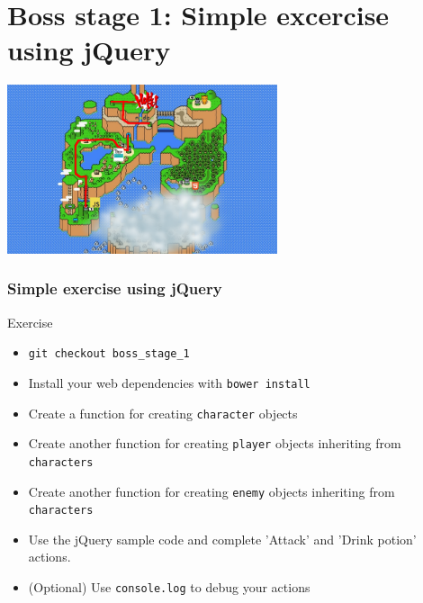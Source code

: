 \section{Boss stage 1: Simple excercise using jQuery}

\begin{frame}[fragile]
  \begin{center}
    \includegraphics[width=300px]{images/map_boss_stage_1.png}
  \end{center}
\end{frame}

\begin{frame}[fragile]
  \frametitle{Simple exercise using jQuery}
  \begin{block}{Exercise}
    \begin{itemize}
      \item \texttt{git checkout boss\_stage\_1}
      \item Install your web dependencies with \texttt{bower install}
      \item Create a function for creating \texttt{character} objects
      \item Create another function for creating \texttt{player} objects inheriting from \texttt{characters}
      \item Create another function for creating \texttt{enemy} objects inheriting from \texttt{characters}
      \item Use the jQuery sample code and complete 'Attack' and 'Drink potion' actions.
      \item (Optional) Use \texttt{console.log} to debug your actions
    \end{itemize}
  \end{block}
\end{frame}
